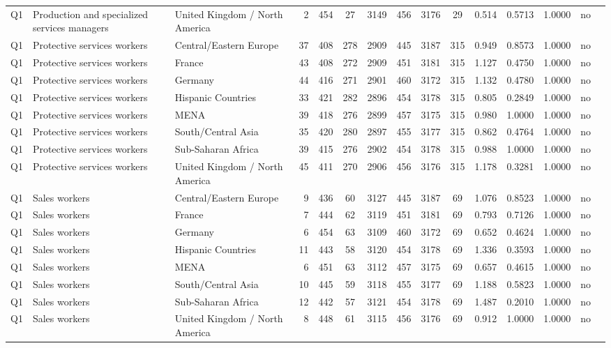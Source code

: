 \begin{longtable}{lllrcccccccccll}
Q1 & Production and specialized services managers & United Kingdom / North America & 2 & 454 & 27 & 3149 & 456 & 3176 & 29 & 0.514 & 0.5713 & 1.0000 & no \\
Q1 & Protective services workers & Central/Eastern Europe & 37 & 408 & 278 & 2909 & 445 & 3187 & 315 & 0.949 & 0.8573 & 1.0000 & no \\
Q1 & Protective services workers & France & 43 & 408 & 272 & 2909 & 451 & 3181 & 315 & 1.127 & 0.4750 & 1.0000 & no \\
Q1 & Protective services workers & Germany & 44 & 416 & 271 & 2901 & 460 & 3172 & 315 & 1.132 & 0.4780 & 1.0000 & no \\
Q1 & Protective services workers & Hispanic Countries & 33 & 421 & 282 & 2896 & 454 & 3178 & 315 & 0.805 & 0.2849 & 1.0000 & no \\
Q1 & Protective services workers & MENA & 39 & 418 & 276 & 2899 & 457 & 3175 & 315 & 0.980 & 1.0000 & 1.0000 & no \\
Q1 & Protective services workers & South/Central Asia & 35 & 420 & 280 & 2897 & 455 & 3177 & 315 & 0.862 & 0.4764 & 1.0000 & no \\
Q1 & Protective services workers & Sub-Saharan Africa & 39 & 415 & 276 & 2902 & 454 & 3178 & 315 & 0.988 & 1.0000 & 1.0000 & no \\
Q1 & Protective services workers & United Kingdom / North America & 45 & 411 & 270 & 2906 & 456 & 3176 & 315 & 1.178 & 0.3281 & 1.0000 & no \\
Q1 & Sales workers & Central/Eastern Europe & 9 & 436 & 60 & 3127 & 445 & 3187 & 69 & 1.076 & 0.8523 & 1.0000 & no \\
Q1 & Sales workers & France & 7 & 444 & 62 & 3119 & 451 & 3181 & 69 & 0.793 & 0.7126 & 1.0000 & no \\
Q1 & Sales workers & Germany & 6 & 454 & 63 & 3109 & 460 & 3172 & 69 & 0.652 & 0.4624 & 1.0000 & no \\
Q1 & Sales workers & Hispanic Countries & 11 & 443 & 58 & 3120 & 454 & 3178 & 69 & 1.336 & 0.3593 & 1.0000 & no \\
Q1 & Sales workers & MENA & 6 & 451 & 63 & 3112 & 457 & 3175 & 69 & 0.657 & 0.4615 & 1.0000 & no \\
Q1 & Sales workers & South/Central Asia & 10 & 445 & 59 & 3118 & 455 & 3177 & 69 & 1.188 & 0.5823 & 1.0000 & no \\
Q1 & Sales workers & Sub-Saharan Africa & 12 & 442 & 57 & 3121 & 454 & 3178 & 69 & 1.487 & 0.2010 & 1.0000 & no \\
Q1 & Sales workers & United Kingdom / North America & 8 & 448 & 61 & 3115 & 456 & 3176 & 69 & 0.912 & 1.0000 & 1.0000 & no \\

\end{longtable}
